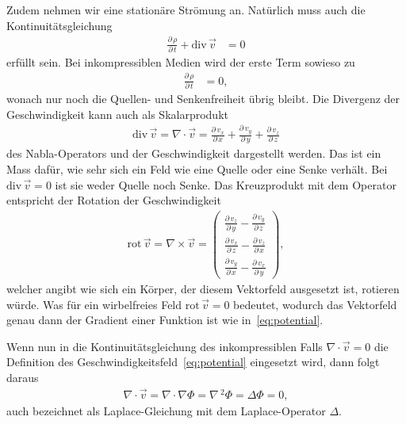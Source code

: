 Zudem nehmen wir eine stationäre Strömung an.
Natürlich muss auch die Kontinuitätsgleichung
\begin{align*}
    \frac{\partial\,\rho}{\partial\,t} + 
    \mathrm{div}\,\vec{v} &= 0
\end{align*}
erfüllt sein.
Bei inkompressiblen Medien wird der erste Term sowieso zu
\begin{align*}
    \frac{\partial\,\rho}{\partial\,t} &= 0,
\end{align*}
wonach nur noch die Quellen- und Senkenfreiheit übrig bleibt.
Die Divergenz der Geschwindigkeit kann auch als Skalarprodukt 
\begin{align*}
    \mathrm{div}\,\vec{v}
    =
    \nabla \cdot \vec{v}
    =
    \frac{\partial\,v_x}{\partial\,x} +
    \frac{\partial\,v_y}{\partial\,y} +
    \frac{\partial\,v_z}{\partial\,z}
\end{align*}
des Nabla-Operators und der Geschwindigkeit dargestellt werden.
Das ist ein Mass dafür, wie sehr sich ein Feld wie eine Quelle 
oder eine Senke verhält.
Bei $\mathrm{div}\,\vec{v} = 0$ ist sie weder Quelle noch Senke.
Das Kreuzprodukt mit dem Operator entspricht
der Rotation der Geschwindigkeit
\begin{align*}
    \mathrm{rot}\,\vec{v} 
    =
    \nabla \times \vec{v}
    =
    \begin{pmatrix}
        \frac{\partial\,v_z}{\partial\,y} - \frac{\partial\,v_y}{\partial\,z} \\
        \frac{\partial\,v_x}{\partial\,z} - \frac{\partial\,v_z}{\partial\,x} \\
        \frac{\partial\,v_y}{\partial\,x} - \frac{\partial\,v_x}{\partial\,y}
    \end{pmatrix},
\end{align*}
welcher angibt wie sich ein Körper, der diesem Vektorfeld 
ausgesetzt ist, rotieren würde.
Was für ein wirbelfreies Feld $\mathrm{rot}\,\vec{v} = 0$ bedeutet,
wodurch das Vektorfeld genau dann der Gradient einer Funktion ist
wie in~\eqref{eq:potential}.

Wenn nun in die Kontinuitätsgleichung des inkompressiblen
Falls $ \nabla \cdot \vec{v} = 0$ die Definition 
des Geschwindigkeitsfeld~\eqref{eq:potential} eingesetzt wird, dann folgt daraus
\begin{align}
    \nabla \cdot \vec{v}
    = 
    \nabla \cdot \nabla \Phi
    = 
    \nabla\,^2 \Phi
    =
    \Delta\Phi
    =
    0,\label{eq:laplace}
\end{align}
auch bezeichnet als Laplace-Gleichung mit dem Laplace-Operator $\Delta$.



